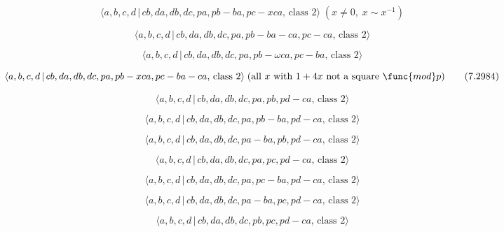 \documentclass[10pt]{article}
\begin{document}
\begin{equation}
\langle a,b,c,d\,|\,cb,da,db,dc,pa,pb-ba,pc-xca,\,\text{class }2\rangle
\;(x\neq 0,\;x\sim x^{-1})  \tag{7.2981}
\end{equation}

\begin{equation}
\langle a,b,c,d\,|\,cb,da,db,dc,pa,pb-ba-ca,pc-ca,\,\text{class }2\rangle 
\tag{7.2982}
\end{equation}

\begin{equation}
\langle a,b,c,d\,|\,cb,da,db,dc,pa,pb-\omega ca,pc-ba,\,\text{class }2\rangle
\tag{7.2983}
\end{equation}

\begin{equation}
\langle a,b,c,d\,|\,cb,da,db,dc,pa,pb-xca,pc-ba-ca,\,\text{class }2\rangle
\;(\text{all }x\text{ with }1+4x\text{ not a square }\func{mod}p) 
\tag{7.2984}
\end{equation}

\begin{equation}
\langle a,b,c,d\,|\,cb,da,db,dc,pa,pb,pd-ca,\,\text{class }2\rangle 
\tag{7.2985}
\end{equation}

\begin{equation}
\langle a,b,c,d\,|\,cb,da,db,dc,pa,pb-ba,pd-ca,\,\text{class }2\rangle 
\tag{7.2986}
\end{equation}

\begin{equation}
\langle a,b,c,d\,|\,cb,da,db,dc,pa-ba,pb,pd-ca,\,\text{class }2\rangle 
\tag{7.2987}
\end{equation}

\begin{equation}
\langle a,b,c,d\,|\,cb,da,db,dc,pa,pc,pd-ca,\,\text{class }2\rangle 
\tag{7.2988}
\end{equation}

\begin{equation}
\langle a,b,c,d\,|\,cb,da,db,dc,pa,pc-ba,pd-ca,\,\text{class }2\rangle 
\tag{7.2989}
\end{equation}

\begin{equation}
\langle a,b,c,d\,|\,cb,da,db,dc,pa-ba,pc,pd-ca,\,\text{class }2\rangle 
\tag{7.2990}
\end{equation}

\begin{equation}
\langle a,b,c,d\,|\,cb,da,db,dc,pb,pc,pd-ca,\,\text{class }2\rangle 
\tag{7.2991}
\end{equation}
\end{document}
